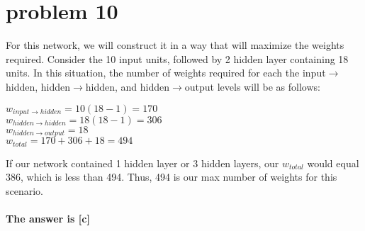 \documentclass{article}
\begin{document}
\section*{problem 10}
For this network, we will construct it in a way that will maximize the weights required. Consider the 10 input units, followed by 2 hidden layer containing 18 units. In this situation, the number of weights required for each the input$\rightarrow$hidden, hidden$\rightarrow$hidden, and hidden$\rightarrow$output levels will be as follows:
\begin{center}
    $w_{input\rightarrow hidden} = 10(18-1) = 170$\\
    $w_{hidden\rightarrow hidden} = 18(18-1) = 306$\\
    $w_{hidden\rightarrow output} = 18$\\
    $w_{total} = 170+306+18 = 494$
\end{center}
If our network contained 1 hidden layer or 3 hidden layers, our $w_{total}$ would equal 386, which is less than 494. Thus, 494 is our max number of weights for this scenario.\\\\
\textbf{The answer is [c]}
\end{document}
